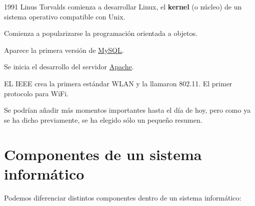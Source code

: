 \begin{description}
    \begin{minipage}{0.8\linewidth}
        \item[1991] Linus Torvalds comienza a desarrollar Linux, el \textbf{kernel} (o núcleo) de un sistema operativo compatible con Unix.
    \end{minipage}
    \hfill
    \begin{minipage}{0.1\linewidth}
        \hfill
        
    \end{minipage}

    \item[1991] Comienza a popularizarse la programación orientada a objetos.

    \item[1995] Aparece la primera versión de \href{https://es.wikipedia.org/wiki/MySQL}{MySQL}.

    \item[1995] Se inicia el desarrollo del servidor \href{https://es.wikipedia.org/wiki/Servidor_HTTP_Apache}{Apache}.

    \item[1997] EL IEEE crea la primera estándar WLAN y la llamaron 802.11. El primer protocolo para WiFi.

\end{description}

Se podrían añadir más momentos importantes hasta el día de hoy, pero como ya se ha dicho previamente, se ha elegido sólo un pequeño resumen.

\section{Componentes de un sistema informático}

Podemos diferenciar distintos componentes dentro de un sistema informático:

